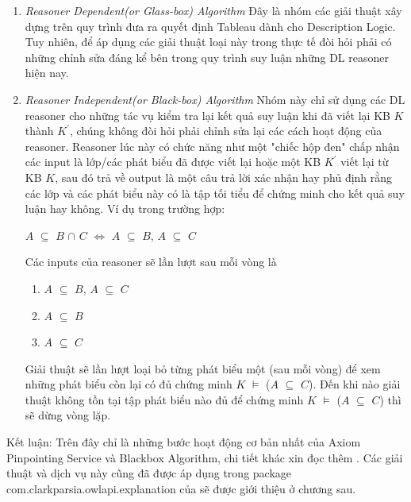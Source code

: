 		\begin{enumerate}
			\item \textit{Reasoner Dependent(or Glass-box) Algorithm} Đây là nhóm các giải thuật xây dựng trên quy trình đưa ra quyết định Tableau dành cho Description Logic. Tuy nhiên, để áp dụng các giải thuật loại này trong thực tế đòi hỏi phải có những chỉnh sửa đáng kể bên trong quy trình suy luận những DL reasoner hiện nay.
			\item \textit{Reasoner Independent(or Black-box) Algorithm} Nhóm này chỉ sử dụng các DL reasoner cho những tác vụ kiểm tra lại kết quả suy luận khi đã viết lại KB $K$ thành $K^{'}$, chúng không đòi hỏi phải chỉnh sửa lại các cách hoạt động của reasoner. Reasoner lúc này có chức năng như một "chiếc hộp đen" chấp nhận các input là lớp/các phát biểu đã được viết lại hoặc một KB $K^{'}$ viết lại từ KB $K$, sau đó trả về output là một câu trả lời xác nhận hay phủ định rằng các lớp và các phát biểu này có là tập tối tiểu để chứng minh cho kết quả suy luận hay không. Ví dụ trong trường hợp:
			\begin{center}
				$A$ $\subseteq$ $B$ $\cap$ $C$ $\Leftrightarrow$ $A$ $\subseteq$ $B$, $A$ $\subseteq$ $C$
			\end{center}
			Các inputs của reasoner sẽ lần lượt sau mỗi vòng là 
			\begin{enumerate}
				\item $A$ $\subseteq$ $B$, $A$ $\subseteq$ $C$
				\item $A$ $\subseteq$ $B$
				\item $A$ $\subseteq$ $C$
			\end{enumerate}
			Giải thuật sẽ lần lượt loại bỏ từng phát biểu một (sau mỗi vòng) để xem những phát biểu còn lại có đủ chứng minh  $K$ $\models$ ($A$ $\subseteq$ $C$). Đến khi nào giải thuật không tồn tại tập phát biểu nào đủ để chứng minh $K$ $\models$ ($A$ $\subseteq$ $C$) thì sẽ dừng vòng lặp.
		\end{enumerate}
		Kết luận: Trên đây chỉ là những bước hoạt động cơ bản nhất của Axiom Pinpointing Service và Blackbox Algorithm, chi tiết khác xin đọc thêm \cite{axiomPinpoint}. Các giải thuật và dịch vụ này cũng đã được áp dụng trong package com.clarkparsia.owlapi.explanation của \cite{owowlapi} sẽ được giới thiệu ở chương sau.
